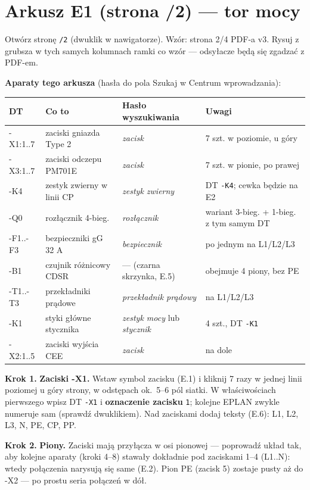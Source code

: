 \documentclass[11pt,a4paper]{article}
\newcommand{\ui}[1]{\textbf{#1}}                    %
\newcommand{\krok}[1]{\par\medskip\noindent\textbf{\color{granat}Krok #1.}\space}
\begin{document}
\section{Arkusz E1 (strona /2) --- tor mocy}
\label{sec:e1}

Otwórz stronę \texttt{/2} (dwuklik w nawigatorze). Wzór: strona 2/4 PDF-a v3.
Rysuj z grubsza w tych samych kolumnach ramki co wzór --- odsyłacze będą się zgadzać z PDF-em.

\textbf{Aparaty tego arkusza} (hasła do pola Szukaj w Centrum wprowadzania):

\begin{longtable}{@{}p{}p{}p{}p{}@{}}
\toprule
\textbf{DT} & \textbf{Co to} & \textbf{Hasło wyszukiwania} & \textbf{Uwagi}\\
\midrule
\endhead
-X1:1..7 & zaciski gniazda Type 2 & \emph{zacisk} & 7 szt. w poziomie, u góry\\
-X3:1..7 & zaciski odczepu PM701E & \emph{zacisk} & 7 szt. w pionie, po prawej\\
-K4 & zestyk zwierny w linii CP & \emph{zestyk zwierny} & DT \texttt{-K4}; cewka będzie na E2\\
-Q0 & rozłącznik 4-bieg. & \emph{rozłącznik} & wariant 3-bieg. + 1-bieg. z tym samym DT\\
-F1..-F3 & bezpieczniki gG 32 A & \emph{bezpiecznik} & po jednym na L1/L2/L3\\
-B1 & czujnik różnicowy CDSR & --- (czarna skrzynka, E.5) & obejmuje 4 piony, bez PE\\
-T1..-T3 & przekładniki prądowe & \emph{przekładnik prądowy} & na L1/L2/L3\\
-K1 & styki główne stycznika & \emph{zestyk mocy} lub \emph{stycznik} & 4 szt., DT \texttt{-K1}\\
-X2:1..5 & zaciski wyjścia CEE & \emph{zacisk} & na dole\\
\bottomrule
\end{longtable}

\krok{1} \textbf{Zaciski -X1.} Wstaw symbol zacisku (E.1) i kliknij 7 razy w jednej linii
poziomej u góry strony, w odstępach ok.\ 5--6 pól siatki. W właściwościach pierwszego wpisz
DT \texttt{-X1} i \ui{oznaczenie zacisku} \texttt{1}; kolejne EPLAN zwykle numeruje sam (sprawdź
dwuklikiem). Nad zaciskami dodaj teksty (E.6): L1, L2, L3, N, PE, CP, PP.

\krok{2} \textbf{Piony.} Zaciski mają przyłącza w osi pionowej --- poprowadź układ tak, aby
kolejne aparaty (kroki 4--8) stawały dokładnie pod zaciskami 1--4 (L1..N): wtedy połączenia
narysują się same (E.2). Pion PE (zacisk 5) zostaje pusty aż do -X2 --- po prostu seria
połączeń w dół.
\end{document}
